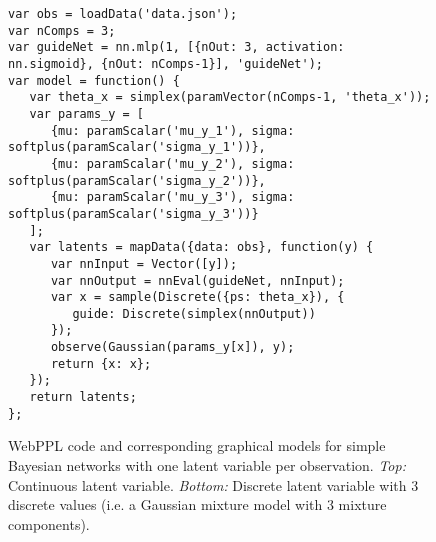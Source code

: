 \begin{figure}
\begin{minipage}{\linewidth}
\begin{minipage}{0.66\linewidth}
\begin{lstlisting}[style=smaller]
var obs = loadData('data.json');
var nComps = 3;
var guideNet = nn.mlp(1, [{nOut: 3, activation: nn.sigmoid}, {nOut: nComps-1}], 'guideNet');
var model = function() {
   var theta_x = simplex(paramVector(nComps-1, 'theta_x'));
   var params_y = [
      {mu: paramScalar('mu_y_1'), sigma: softplus(paramScalar('sigma_y_1'))},
      {mu: paramScalar('mu_y_2'), sigma: softplus(paramScalar('sigma_y_2'))},
      {mu: paramScalar('mu_y_3'), sigma: softplus(paramScalar('sigma_y_3'))}
   ];
   var latents = mapData({data: obs}, function(y) {
      var nnInput = Vector([y]);
      var nnOutput = nnEval(guideNet, nnInput);
      var x = sample(Discrete({ps: theta_x}), {
         guide: Discrete(simplex(nnOutput))
      });
      observe(Gaussian(params_y[x]), y);
      return {x: x};
   });
   return latents;
};
\end{lstlisting}
\end{minipage}
%
\begin{minipage}{0.33\linewidth}
\begin{flushright}
\end{flushright}
\end{minipage}
\end{minipage}

\caption{WebPPL code and corresponding graphical models for simple Bayesian networks with one latent variable per observation. \emph{Top:} Continuous latent variable. \emph{Bottom:} Discrete latent variable with 3 discrete values (i.e. a Gaussian mixture model with 3 mixture components).~}
\label{fig:bn_oneLatent}

\end{figure}


